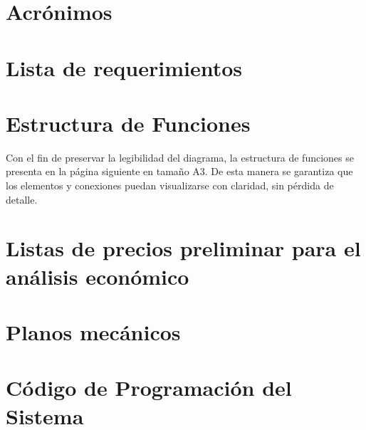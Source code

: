 \appendix

\chapter{Acr\'onimos}

\label{an:Annex_A_Acronimos}
    
\cleardoublepage 
\chapter{Lista de requerimientos}
\label{an:Annex_B_TablaVariables}

\cleardoublepage



\chapter{Estructura de Funciones}
\label{an:Annex_estrucutra}
Con el fin de preservar la legibilidad del diagrama, la estructura de funciones se presenta en la página siguiente en tamaño A3. De esta manera se garantiza que los elementos y conexiones puedan visualizarse con claridad, sin pérdida de detalle.

\clearpage 





\chapter{Listas de precios preliminar para el análisis económico}
\label{an:Annex_D_precios_preliminares}

\cleardoublepage


\chapter{Planos mecánicos}
\label{an:Annex_E_Planos_Mecánicos}

\chapter{Código de Programación del Sistema}
\label{an:Annex_F_CodigoSistema}


